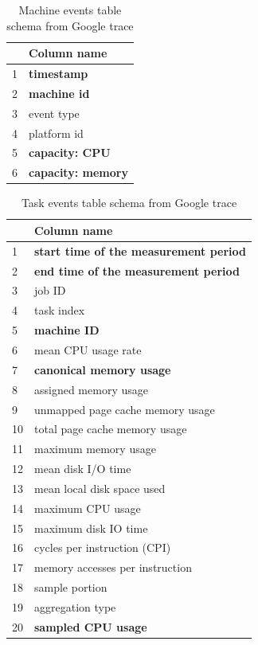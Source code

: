 \documentclass[]{final_report}
\begin{document}
\begin{table}[h]
\begin{center}
    \begin{tabular}{| l | l |}
    \hline
    & \textbf{Column name} \\
    \hline
    1 & \textbf{timestamp}\\
    \hline
    2 & \textbf{machine id} \\
     \hline
    3 & event type\\
     \hline
    4 & platform id\\
     \hline
    5 & \textbf{capacity: CPU}\\
     \hline
    6 & \textbf{capacity: memory}\\
    \hline
    \end{tabular}
\end{center}
\caption{Machine events table schema from Google trace}
\label{tab:machine_events}
\end{table}


\begin{table}[h]
\begin{center}
    \begin{tabular}{| l | l |}
    \hline
    & \textbf{Column name} \\
    \hline
    1 & \textbf{start time of the measurement period}\\
    \hline
    2 & \textbf{end time of the measurement period}\\
     \hline
    3 & job ID\\
     \hline
    4 & task index\\
     \hline
    5 & \textbf{machine ID} \\
     \hline
    6 & mean CPU usage rate \\
    \hline
    7 & \textbf{canonical memory usage}\\
    \hline
    8 & assigned memory usage\\
    \hline
    9 & unmapped page cache memory usage\\
    \hline
    10 & total page cache memory usage\\
    \hline
    11 & maximum memory usage\\
    \hline
    12 & mean disk I/O time\\
    \hline
    13 & mean local disk space used\\
    \hline
    14 & maximum CPU usage\\
    \hline
    15 & maximum disk IO time\\
    \hline
    16 & cycles per instruction (CPI)\\
    \hline
    17 & memory accesses per instruction\\
    \hline
    18 & sample portion\\
    \hline
    19 & aggregation type \\
    \hline    
    20 & \textbf{sampled CPU usage}\\
    \hline
    \end{tabular}
\end{center}
\caption{Task events table schema from Google trace}
\label{tab:task_events}
\end{table}
\end{document}
